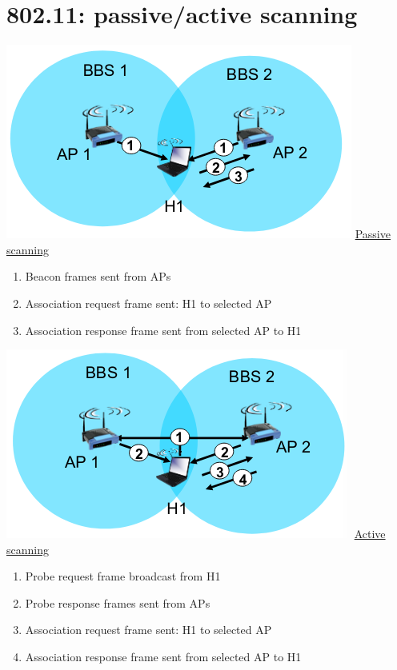 \documentclass{article}[18pt]
\begin{document}
\section{802.11: passive/active scanning}
\begin{minipage}{0.5\textwidth}
\includegraphics[scale=0.7]{"passive scanning"}
\underline{Passive scanning}
\begin{enumerate}
	\item Beacon frames sent from APs
	\item Association request frame sent: H1 to selected AP
	\item Association response frame sent from selected AP to H1
\end{enumerate}
\end{minipage}
\begin{minipage}{0.5\textwidth}
\includegraphics[scale=0.7]{"active scanning"}
\underline{Active scanning}
\begin{enumerate}
	\item Probe request frame broadcast from H1
	\item Probe response frames sent from APs
	\item Association request frame sent: H1 to selected AP
	\item Association response frame sent from selected AP to H1
\end{enumerate}
\end{minipage}
\end{document}
